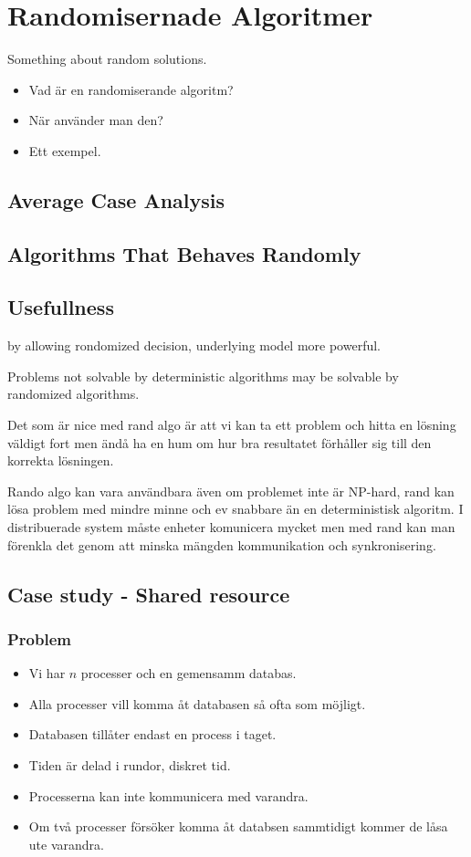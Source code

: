 \documentclass[a4paper]{report}
\begin{document}
\section{Randomisernade Algoritmer}

Something about random solutions.
\begin{itemize}
	\item Vad är en randomiserande algoritm?
	\item När använder man den?
	\item Ett exempel.
\end{itemize}

\subsection{Average Case Analysis}

\subsection{Algorithms That Behaves Randomly}

\subsection{Usefullness}
by allowing rondomized decision, underlying model more powerful.

Problems not solvable by deterministic algorithms may be solvable by randomized
algorithms.

Det som är nice med rand algo är att vi kan ta ett problem och hitta en lösning
väldigt fort men ändå ha en hum om hur bra resultatet förhåller sig till den
korrekta lösningen.

Rando algo kan vara användbara även om problemet inte är NP-hard, rand kan lösa
problem med mindre minne och ev snabbare än en deterministisk algoritm. I
distribuerade system måste enheter komunicera mycket men med rand kan man
förenkla det genom att minska mängden kommunikation och synkronisering. %

\subsection{Case study - Shared resource}
\subsubsection{Problem}
\begin{itemize}
	\item Vi har $n$ processer och en gemensamm databas.
	\item Alla processer vill komma åt databasen så ofta som  möjligt.
	\item Databasen tillåter endast en process i taget.
	\item Tiden är delad i rundor, diskret tid.
	\item Processerna kan inte kommunicera med varandra.
	\item Om två processer försöker komma åt databsen sammtidigt kommer de låsa
		ute varandra.
\end{itemize}
       
\end{document}
